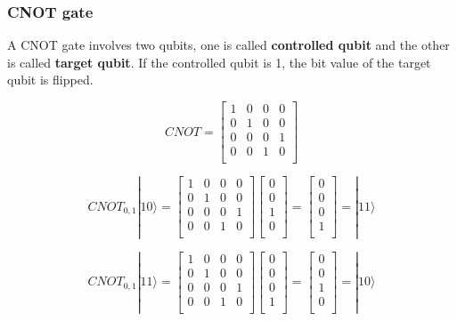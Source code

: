 \subsubsection{CNOT gate}

A CNOT gate involves two qubits, one is called \textbf{controlled qubit} and the other is called \textbf{target qubit}.  If the controlled qubit is 1, the bit value of the target qubit is flipped.

\begin{equation}
CNOT = \begin{bmatrix}
1 & 0 & 0 & 0 \\
0 & 1 & 0 & 0 \\
0 & 0 & 0 & 1 \\
0 & 0 & 1 & 0 \\
\end{bmatrix}
\end{equation}

\begin{equation}
CNOT_{0,1}|10\rangle = 
\begin{bmatrix}
1 & 0 & 0 & 0 \\
0 & 1 & 0 & 0 \\
0 & 0 & 0 & 1 \\
0 & 0 & 1 & 0 \\
\end{bmatrix}
 \left[
\begin{array}{c}
0 \\
0 \\
1 \\
0 \\
\end{array}
\right]
=  \left[
\begin{array}{c}
0 \\
0 \\
0 \\
1 \\
\end{array}
\right] 
= |11\rangle 
\end{equation}

\begin{equation}
CNOT_{0,1}|11\rangle = 
\begin{bmatrix}
1 & 0 & 0 & 0 \\
0 & 1 & 0 & 0 \\
0 & 0 & 0 & 1 \\
0 & 0 & 1 & 0 \\
\end{bmatrix}
 \left[
\begin{array}{c}
0 \\
0 \\
0 \\
1 \\
\end{array}
\right]
=  \left[
\begin{array}{c}
0 \\
0 \\
1 \\
0 \\
\end{array}
\right] 
= |10\rangle 
\end{equation}

